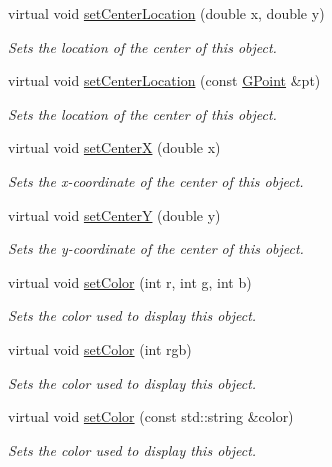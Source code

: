 \begin{DoxyCompactItemize}
virtual void \mbox{\hyperlink{classsgl_1_1GObject_a290b47dd8de1be44089f95cb2c47c1de}{set\+Center\+Location}} (double x, double y)
\begin{DoxyCompactList}\small\item\em Sets the location of the center of this object. \end{DoxyCompactList}\item 
virtual void \mbox{\hyperlink{classsgl_1_1GObject_a1bedf1b233ecba3f753ec58908a683a6}{set\+Center\+Location}} (const \mbox{\hyperlink{structsgl_1_1GPoint}{G\+Point}} \&pt)
\begin{DoxyCompactList}\small\item\em Sets the location of the center of this object. \end{DoxyCompactList}\item 
virtual void \mbox{\hyperlink{classsgl_1_1GObject_a2f4936281e056eead00a9186b9ba8af6}{set\+CenterX}} (double x)
\begin{DoxyCompactList}\small\item\em Sets the x-\/coordinate of the center of this object. \end{DoxyCompactList}\item 
virtual void \mbox{\hyperlink{classsgl_1_1GObject_aad2a22b4fde88c33306b92aebf641d57}{set\+CenterY}} (double y)
\begin{DoxyCompactList}\small\item\em Sets the y-\/coordinate of the center of this object. \end{DoxyCompactList}\item 
virtual void \mbox{\hyperlink{classsgl_1_1GObject_ad57ef49bc31db94e92648aa3737923d6}{set\+Color}} (int r, int g, int b)
\begin{DoxyCompactList}\small\item\em Sets the color used to display this object. \end{DoxyCompactList}\item 
virtual void \mbox{\hyperlink{classsgl_1_1GObject_ab1f5cc0f5cc6bbbd716a526c61f1081d}{set\+Color}} (int rgb)
\begin{DoxyCompactList}\small\item\em Sets the color used to display this object. \end{DoxyCompactList}\item 
virtual void \mbox{\hyperlink{classsgl_1_1GObject_a61374df6c11b52cfbb0815decdbaebc6}{set\+Color}} (const std\+::string \&color)
\begin{DoxyCompactList}\small\item\em Sets the color used to display this object. \end{DoxyCompactList}\item 

\end{DoxyCompactItemize}

